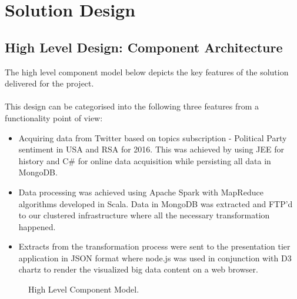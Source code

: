 \documentclass[12pt]{article} %
\begin{document}
	
	
	\section{Solution Design}
		
	\subsection{High Level Design: Component Architecture}
	The high level component model below depicts the key features of the solution delivered for the project.
	\\
	\\
	This design can be categorised into the following three features from a functionality point of view:
	
		\begin{itemize}
			\item Acquiring data from Twitter based on topics subscription - Political Party sentiment in USA and RSA for 2016. This was achieved by using JEE for history and C\# for online data acquisition while persisting all data in MongoDB.
			\item Data processing was achieved using Apache Spark with MapReduce algorithms developed in Scala. Data in MongoDB was extracted and FTP'd to our clustered infrastructure where all the necessary transformation happened.
			\item Extracts from the transformation process were sent to the presentation tier application in JSON format where node.js was used in conjunction with D3 chartz to render the visualized big data content on a web browser.
		\end{itemize}
	
	
		\begin{figure}[H] %
			\caption{High Level Component Model.}
			\label{fig:speciation}
		\end{figure}
	
\end{document}

